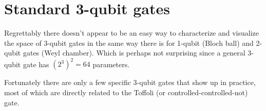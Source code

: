 

\clearpage

\section{Standard 3-qubit gates}

Regrettably there doesn't appear to be an easy way to characterize and visualize the space of 3-qubit gates in the same way there is for 1-qubit (Bloch ball) and 2-qubit gates (Weyl chamber). Which is perhaps not surprising since a general 3-qubit gate has $(2^3)^2 = 64$ parameters. 

Fortunately there are only a few specific 3-qubit gates that show up in practice, most of which are directly related to the Toffoli (or controlled-controlled-not) gate.

